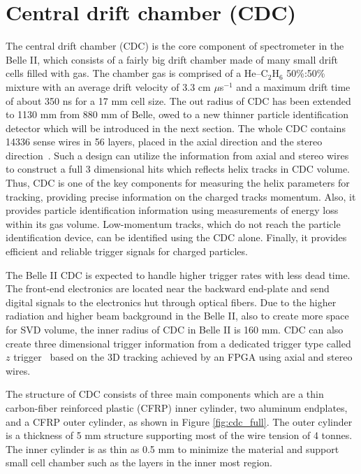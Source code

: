 \section{Central drift chamber (CDC)}
The central drift chamber (CDC) is the core component of spectrometer in the Belle II, which consists of a fairly big drift chamber made of many small drift cells filled with gas. The chamber
gas is comprised of a He–C$_2$H$_6$ 50\%:50\% mixture with an average drift velocity of 3.3 cm $\mu$s$^{-1}$ and a
maximum drift time of about 350 ns for a 17 mm cell size.
The out radius of CDC has been extended to 1130 mm from 880 mm of Belle, owed to a new thinner particle identification detector which will be introduced in the next section. The whole CDC contains 14336 sense wires in 56 layers, placed in the axial direction and the stereo direction~\cite{b2book}\cite{Abe:2010gxa}. Such a design can utilize the information from axial and stereo wires to construct a full 3 dimensional hits which reflects helix tracks in CDC volume. Thus, CDC is one of the key components for measuring the helix parameters for tracking, providing precise information on the charged tracks momentum. Also, it provides particle identification information using measurements of energy loss within its gas volume. Low-momentum tracks, which do not reach the particle identification device, can be identified using the CDC alone. Finally, it provides efficient and reliable trigger signals for charged particles.

The Belle II CDC is expected to handle higher trigger rates with less dead time. The front-end electronics are located near the backward end-plate and send digital signals to the
electronics hut through optical fibers. Due to the higher radiation and higher beam background in the Belle II, also to create more space for SVD volume, the inner radius of CDC in Belle II is 160 mm. CDC can also create three dimensional trigger information from a dedicated trigger type called $z$ trigger~\cite{Abe:2010gxa} based on the 3D tracking achieved by an FPGA using axial and stereo wires.

The structure of CDC consists of three main components which are a thin carbon-fiber reinforced
plastic (CFRP) inner cylinder, two aluminum endplates, and a CFRP outer cylinder, as shown in Figure \ref{fig:cdc_full}. The outer cylinder is a thickness of 5 mm structure supporting most of the wire tension of 4 tonnes. The inner cylinder is as thin as 0.5 mm to minimize the material and support small cell chamber such as the layers in the inner most region. 

